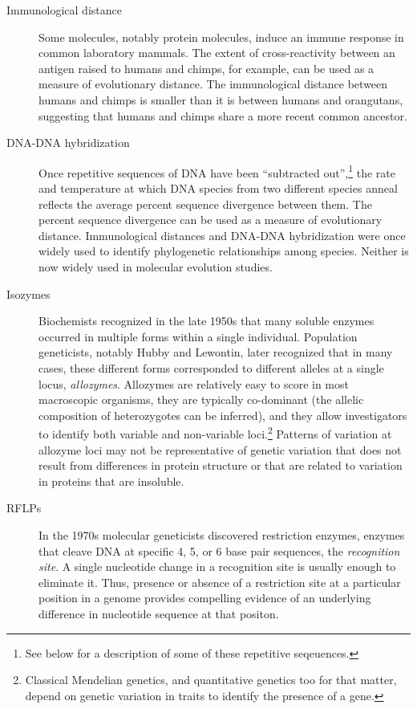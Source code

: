 \documentclass[12pt]{article}
\begin{document}
\begin{description}

\item[Immunological distance] Some molecules, notably protein
  molecules, induce an immune response in common laboratory
  mammals. The extent of cross-reactivity between an antigen raised to
  humans and chimps, for example, can be used as a measure of
  evolutionary distance. The immunological distance between humans and
  chimps is smaller than it is between humans and orangutans,
  suggesting that humans and chimps share a more recent common
  ancestor.

\item[DNA-DNA hybridization] Once repetitive sequences of DNA have
  been ``subtracted out'',\footnote{See below for a description of
    some of these repetitive seqeuences.} the rate and temperature at
  which DNA species from two different species anneal reflects the
  average percent sequence divergence between them. The percent
  sequence divergence can be used as a measure of evolutionary
  distance. Immunological distances and DNA-DNA hybridization were
  once widely used to identify phylogenetic relationships among
  species. Neither is now widely used in molecular evolution studies.

\item[Isozymes] Biochemists recognized in the late 1950s that many
  soluble enzymes occurred in multiple forms within a single
  individual. Population geneticists, notably Hubby and Lewontin, later
  recognized that in many cases, these different forms corresponded to
  different alleles at a single locus, {\it allozymes}. Allozymes are
  relatively easy to score in most macroscopic organisms, they are
  typically co-dominant (the allelic composition of heterozygotes can
  be inferred), and they allow investigators to identify both variable
  and non-variable loci.\footnote{Classical Mendelian genetics, and
    quantitative genetics too for that matter, depend on genetic
    variation in traits to identify the presence of a gene.} Patterns
  of variation at allozyme loci may not be representative of genetic
  variation that does not result from differences in protein structure
  or that are related to variation in proteins that are insoluble.

\item[RFLPs] In the 1970s molecular geneticists discovered restriction
  enzymes, enzymes that cleave DNA at specific 4, 5, or 6 base pair
  sequences, the {\it recognition site}. A single nucleotide change in
  a recognition site is usually enough to eliminate it. Thus, presence
  or absence of a restriction site at a particular position in a
  genome provides compelling evidence of an underlying difference in
  nucleotide sequence at that positon.


\end{description}
\end{document}
